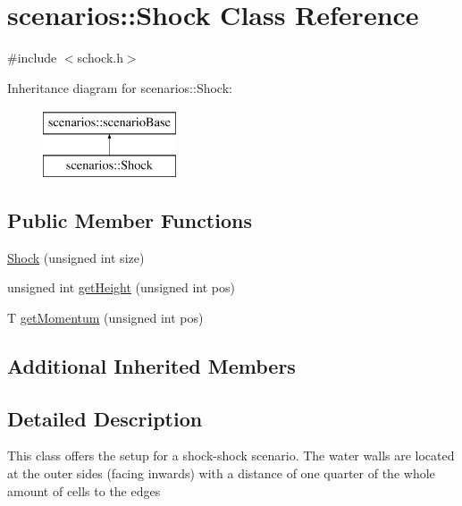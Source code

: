 \hypertarget{classscenarios_1_1Shock}{\section{scenarios\-:\-:Shock Class Reference}
\label{classscenarios_1_1Shock}
}


{\ttfamily \#include $<$schock.\-h$>$}

Inheritance diagram for scenarios\-:\-:Shock\-:\begin{figure}[H]
\begin{center}
\leavevmode
\includegraphics[height=2.000000cm]{classscenarios_1_1Shock}
\end{center}
\end{figure}
\subsection*{Public Member Functions}
\begin{DoxyCompactItemize}
\item 
\hyperlink{classscenarios_1_1Shock_a6c3694a5cfe8968eda7d7f9862e3b035}{Shock} (unsigned int size)
\item 
unsigned int \hyperlink{classscenarios_1_1Shock_a6041f87441e9e04e6f7a9c2fdab12edb}{get\-Height} (unsigned int pos)
\item 
T \hyperlink{classscenarios_1_1Shock_a89b88a5223ae0f82178ac63c724a6d91}{get\-Momentum} (unsigned int pos)
\end{DoxyCompactItemize}
\subsection*{Additional Inherited Members}


\subsection{Detailed Description}
This class offers the setup for a shock-\/shock scenario. The water walls are located at the outer sides (facing inwards) with a distance of one quarter of the whole amount of cells to the edges 

